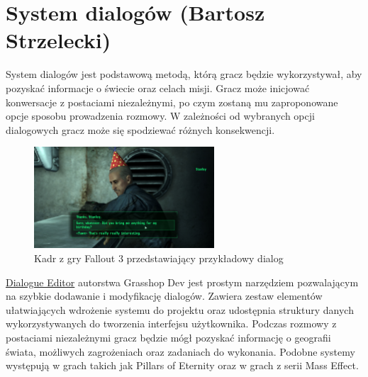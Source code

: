 \section{System dialogów (Bartosz Strzelecki)}

System dialogów jest podstawową metodą, którą gracz będzie wykorzystywał, aby pozyskać informacje  o świecie oraz celach misji.
Gracz może inicjować konwersacje z postaciami niezależnymi, po czym zostaną mu zaproponowane opcje sposobu prowadzenia rozmowy.
W zależności od wybranych opcji dialogowych gracz może się spodziewać różnych konsekwencji.


\begin{figure}[h]
\centering
\includegraphics[width=0.6\textwidth]{images/fallout3}
\caption{Kadr z gry Fallout 3 przedstawiający przykładowy dialog}
\end{figure}

\href{https://assetstore.unity.com/packages/tools/utilities/dialogue-editor-168329}{Dialogue Editor} autorstwa Grasshop Dev jest prostym narzędziem pozwalającym na szybkie dodawanie i modyfikację dialogów.
Zawiera zestaw elementów ułatwiających wdrożenie systemu do projektu oraz udostępnia struktury danych wykorzystywanych do tworzenia interfejsu użytkownika.
Podczas rozmowy z postaciami niezależnymi gracz będzie mógł pozyskać informację o geografii świata, możliwych zagrożeniach oraz zadaniach do wykonania. 
Podobne systemy występują w grach takich jak Pillars of Eternity oraz w grach z serii Mass Effect.

